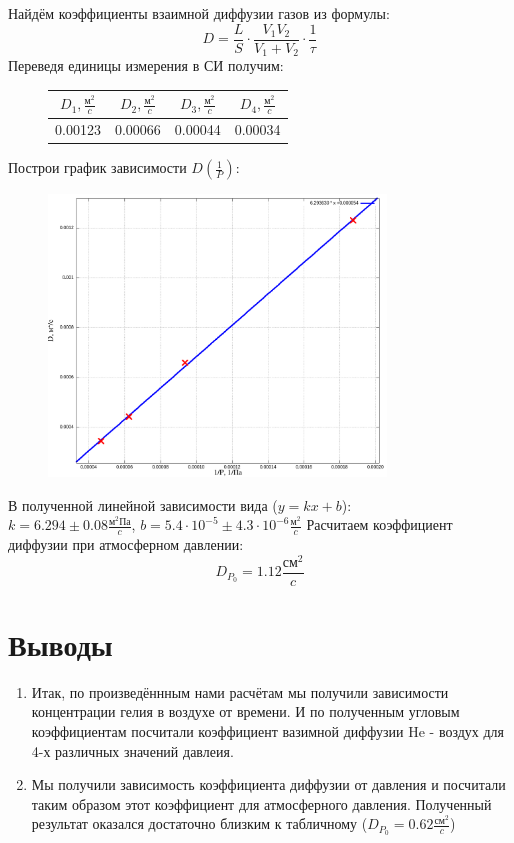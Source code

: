 \documentclass{article}
\begin{document}
Найдём коэффициенты взаимной диффузии газов из формулы:
\[D = \frac{L}{S}\cdot\frac{V_1V_2}{V_1 + V_2}\cdot\frac{1}{\tau}\]
Переведя единицы измерения в СИ получим:
\begin{figure}[H]
    \centering
    \begin{tabular}{|c|c|c|c|}
        \hline
        $D_1, \frac{\text{м}^2}{c}$&$D_2, \frac{\text{м}^2}{c}$&$D_3, \frac{\text{м}^2}{c}$&$D_4, \frac{\text{м}^2}{c}$\\\hline
        0.00123&0.00066&0.00044&0.00034\\\hline
    \end{tabular}
\end{figure}
Построи график зависимости $D\left(\frac{1}{P}\right)$:
\begin{figure}[H]
    \centering
    \includegraphics[width=0.8\textwidth]{graphD.png}
\end{figure}

В полученной линейной зависимости вида ($y = kx + b$):\\
    $k = 6.294 \pm 0.08 \frac{\text{м}^2\text{Па}}{c}$, $b = 5.4\cdot10^{-5} \pm 4.3\cdot10^{-6} \frac{\text{м}^2}{c}$
Расчитаем коэффициент диффузии при атмосферном давлении:
\[ D_{P_0} = 1.12 \frac{\text{см}^2}{c} \]

\section{Выводы}
\begin{enumerate}
    \item 
Итак, по произведённным нами расчётам мы получили зависимости концентрации гелия в воздухе от времени.
И по полученным угловым коэффициентам посчитали коэффициент вазимной диффузии He - воздух для 4-х
различных значений давлеия.
    \item
Мы получили зависимость коэффициента диффузии от давления и посчитали таким образом этот коэффициент 
для атмосферного давления. Полученный результат оказался достаточно близким к табличному ($D_{P_0} = 0.62\frac{\text{см}^2}{c}$)
\end{enumerate}
\end{document}
